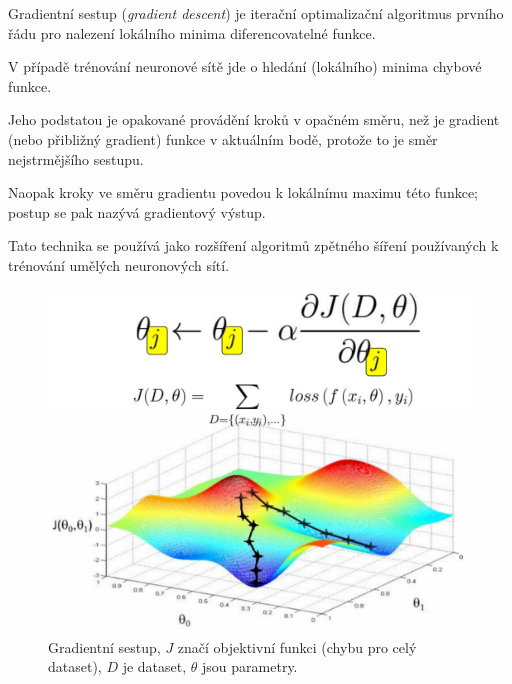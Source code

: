 \begin{compactitem}
    \item Gradientní sestup (\textit{gradient descent}) je iterační optimalizační algoritmus prvního řádu pro nalezení lokálního minima diferencovatelné funkce. \begin{compactitem}
        \item V případě trénování neuronové sítě jde o hledání (lokálního) minima chybové funkce.
    \end{compactitem}

    \item Jeho podstatou je opakované provádění kroků v opačném směru, než je gradient (nebo přibližný gradient) funkce v aktuálním bodě, protože to je směr nejstrmějšího sestupu. \begin{compactitem}
        \item Naopak kroky ve směru gradientu povedou k lokálnímu maximu této funkce; postup se pak nazývá gradientový výstup.
    \end{compactitem}

    \item Tato technika se používá jako rozšíření algoritmů zpětného šíření používaných k trénování umělých neuronových sítí.
\end{compactitem}

\begin{figure}[H]
    \centering
    \includegraphics[width=0.8\linewidth]{gradient_descent.pdf}
    \caption{Gradientní sestup, $J$ značí objektivní funkci (chybu pro celý dataset), $D$ je dataset, $\theta$ jsou parametry.}
\end{figure}


